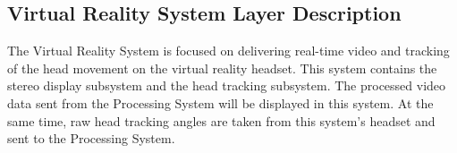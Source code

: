 \subsection{Virtual Reality System Layer Description}
The Virtual Reality System is focused on delivering real-time video and tracking of the head movement on the virtual reality headset. This system contains the stereo display subsystem and the head tracking subsystem. The processed video data sent from the Processing System will be displayed in this system. At the same time, raw head tracking angles are taken from this system's headset and sent to the Processing System.